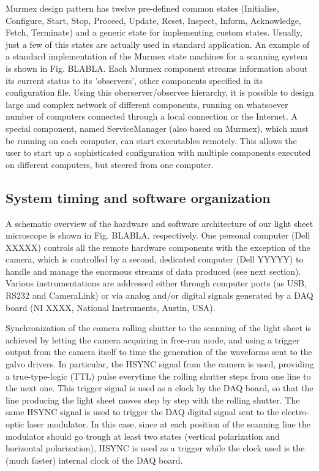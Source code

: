 \documentclass[12pt]{spieman}  %
\begin{document}
Murmex design pattern has twelve pre-defined common states (Initialise, Configure, Start, Stop, Proceed, Update, Reset, Inspect, Inform, Acknowledge, Fetch, Terminate) and a generic state for implementing custom states. Usually, just a few of this states are actually used in standard application. An example of a standard implementation of the Murmex state machines for a scanning system is shown in Fig. BLABLA. Each Murmex component streams information about its current status to its 'observers', other components specified in its configuration file. Using this oberserver/observee hierarchy, it is possible to design large and complex network of different components, running on whatsoever number of computers connected through a local connection or the Internet. A special component, named ServiceManager (also based on Murmex), which must be running on each computer, can start executables remotely. This allows the user to start up a sophisticated configuration with multiple components executed on different computers, but steered from one computer.

\subsection{System timing and software organization}

A schematic overview of the hardware and software architecture of our light sheet microscope is shown in Fig. BLABLA, respectively. One personal computer (Dell XXXXX) controls all the remote hardware components with the exception of the camera, which is controlled by a second, dedicated computer (Dell YYYYY) to handle and manage the enormous streams of data produced (see next section). Various instrumentations are addressed either through computer ports (as USB, RS232 and CameraLink) or via analog and/or digital signals generated by a DAQ board (NI XXXX, National Instruments, Austin, USA).

Synchronization of the camera rolling shutter to the scanning of the light sheet is achieved by letting the camera acquiring in free-run mode, and using a trigger output from the camera itself to time the generation of the waveforms sent to the galvo drivers. In particular, the HSYNC signal from the camera is used, providing a true-type-logic (TTL) pulse everytime the rolling shutter steps from one line to the next one. This trigger signal is used as a clock by the DAQ board, so that the line producing the light sheet moves step by step with the rolling shutter. The same HSYNC signal is used to trigger the DAQ digital signal sent to the electro-optic laser modulator. In this case, since at each position of the scanning line the modulator should go trough at least two states (vertical polarization and horizontal polarization), HSYNC is used as a trigger while the clock used is the (much faster) internal clock of the DAQ board.
\end{document}
